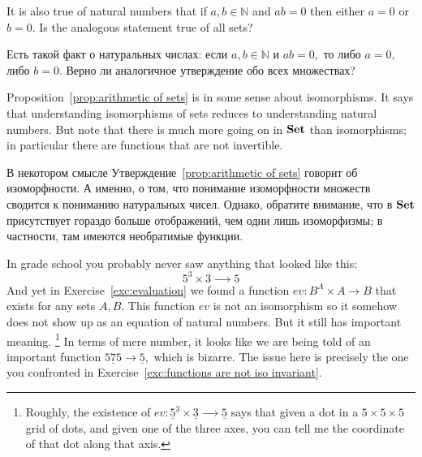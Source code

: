\documentclass[../main/CT4S-EN-RU]{subfiles}
\begin{document}
\begin{exerciseENG}
It is also true of natural numbers that if $a,b\in{ℕ}$ and $ab=0$ then either $a=0$ or $b=0.$ Is the analogous statement true of all sets?
\end{exerciseENG}

\begin{exerciseRUS}
Есть такой факт о натуральных числах: если $a,b\in{ℕ}$ и $ab=0,$ то либо $a=0,$ либо $b=0.$ Верно ли аналогичное утверждение обо всех множествах?
\end{exerciseRUS}

\begin{blockENG}
Proposition~\ref{prop:arithmetic of sets} is in some sense about isomorphisms. It says that understanding isomorphisms of sets reduces to understanding natural numbers. But note that there is much more going on in ${\mathbf{Set}}$ than isomorphisms; in particular there are functions that are not invertible.
\end{blockENG}

\begin{blockRUS}
В некотором смысле Утверждение~\ref{prop:arithmetic of sets} говорит об изоморфности. А именно, о том, что понимание изоморфности множеств сводится к пониманию натуральных чисел. Однако, обратите внимание, что в ${\mathbf{Set}}$ присутствует гораздо больше отображений, чем одни лишь изоморфизмы; в частности, там имеются необратимые функции.
\end{blockRUS}

\begin{blockENG}
In grade school you probably never saw anything that looked like this:
$$5^3\times 3{⟶} 5$$
And yet in Exercise~\ref{exc:evaluation} we found a function $ev\colon B^A\times A{→} B$ that exists for any sets $A,B.$ This function $ev$ is not an isomorphism so it somehow does not show up as an equation of natural numbers. But it still has important meaning.%
\footnote{Roughly, the existence of $ev\colon\underline{5}^{\underline{3}}\times\underline{3}{⟶} \underline{5}$ says that given a dot in a $5\times 5\times 5$ grid of dots, and given one of the three axes, you can tell me the coordinate of that dot along that axis.} In terms of mere number, it looks like we are being told of an important function $\underline{575}{→}\underline{5},$ which is bizarre. The issue here is precisely the one you confronted in Exercise~\ref{exc:functions are not iso invariant}.
\end{blockENG}
\end{document}
